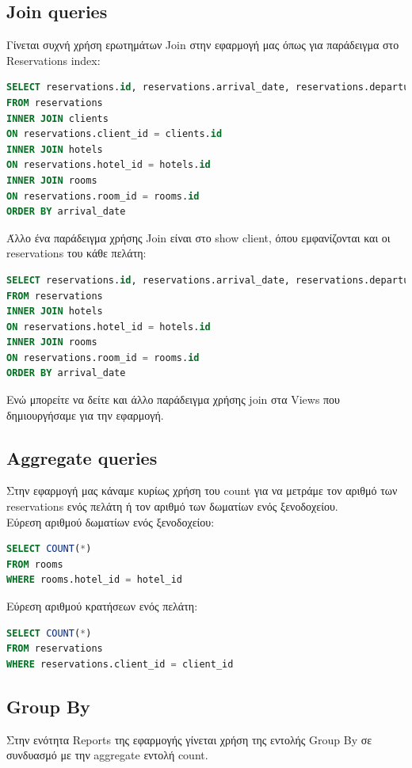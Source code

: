 \documentclass[a4paper,12pt]{article}
\begin{document}
	\subsection{Join queries}
	Γίνεται συχνή χρήση ερωτημάτων Join στην εφαρμογή μας όπως για παράδειγμα στο Reservations index:
	\begin{lstlisting}[language=SQL]
SELECT reservations.id, reservations.arrival_date, reservations.departure_date, reservations.created_at, reservations.updated_at, clients.first_name, clients.last_name, hotels.name, rooms.room_type
FROM reservations
INNER JOIN clients
ON reservations.client_id = clients.id
INNER JOIN hotels
ON reservations.hotel_id = hotels.id
INNER JOIN rooms
ON reservations.room_id = rooms.id
ORDER BY arrival_date
	\end{lstlisting}
	Άλλο ένα παράδειγμα χρήσης Join είναι στο show client, όπου εμφανίζονται και οι reservations του κάθε πελάτη:
	\begin{lstlisting}[language=SQL]
SELECT reservations.id, reservations.arrival_date, reservations.departure_date, reservations.created_at, reservations.updated_at, hotels.name, rooms.room_type
FROM reservations
INNER JOIN hotels
ON reservations.hotel_id = hotels.id
INNER JOIN rooms
ON reservations.room_id = rooms.id
ORDER BY arrival_date
	\end{lstlisting}
	Ενώ μπορείτε να δείτε και άλλο παράδειγμα χρήσης join στα Views που δημιουργήσαμε για την εφαρμογή.
	
	\subsection{Aggregate queries}
	Στην εφαρμογή μας κάναμε κυρίως χρήση του count για να μετράμε τον αριθμό των reservations ενός πελάτη ή τον αριθμό των δωματίων ενός ξενοδοχείου.\\

	Εύρεση αριθμού δωματίων ενός ξενοδοχείου:  
	\begin{lstlisting}[language=SQL]
SELECT COUNT(*) 
FROM rooms 
WHERE rooms.hotel_id = hotel_id
	\end{lstlisting}
	
	Εύρεση αριθμού κρατήσεων ενός πελάτη: 
	\begin{lstlisting}[language=SQL]
SELECT COUNT(*) 
FROM reservations 
WHERE reservations.client_id = client_id
	\end{lstlisting}
	
	\subsection{Group By}
	Στην ενότητα Reports της εφαρμογής γίνεται χρήση της εντολής Group By σε συνδυασμό με την aggregate εντολή count.
	
\end{document}
